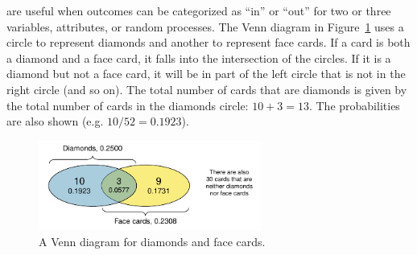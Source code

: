  are useful when outcomes can be categorized as ``in'' or ``out'' for two or three variables, attributes, or random processes. The Venn diagram in Figure~\ref{cardsDiamondFaceVenn} uses a circle to represent diamonds and another to represent face cards. If a card is both a diamond and a face card, it falls into the intersection of the circles. If it is a diamond but not a face card, it will be in part of the left circle that is not in the right circle (and so on). The total number of cards that are diamonds is given by the total number of cards in the diamonds circle: $10+3=13$. The probabilities are also shown (e.g. $10/52 = 0.1923$).

\begin{figure}
\centering
\includegraphics[width=0.65\textwidth]{ch_probability/figures/cardsDiamondFaceVenn/cardsDiamondFaceVenn}
\caption{A Venn diagram for diamonds and face cards.}
\label{cardsDiamondFaceVenn}
\end{figure}



